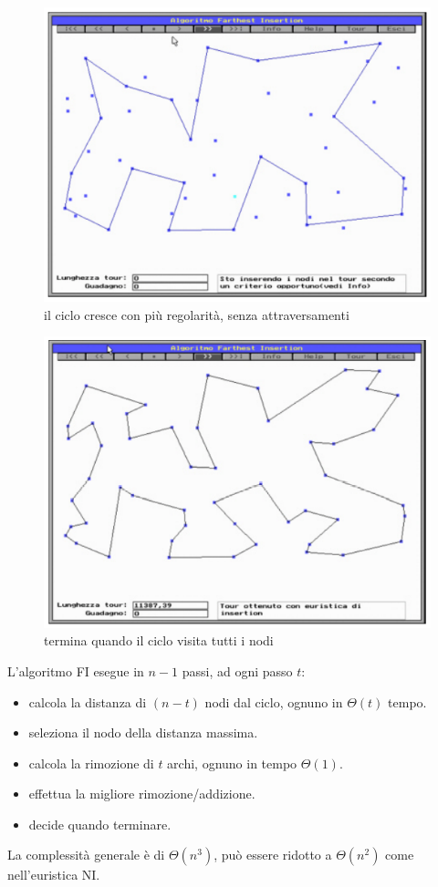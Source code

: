 \documentclass{article}
\begin{document}
\begin{figure}[H]
    \centering
    \includegraphics[scale=0.5]{images/farthest3.png}
    \caption{il ciclo cresce con più regolarità, senza attraversamenti}
\end{figure}

\begin{figure}[H]
    \centering
    \includegraphics[scale=0.5]{images/farthest4.png}
    \caption{termina quando il ciclo visita tutti i nodi}
\end{figure}

L'algoritmo FI esegue in $n-1$ passi, ad ogni passo $t$:
\begin{itemize}
    \item calcola la distanza di $(n-t)$ nodi dal ciclo, ognuno in $\Theta(t)$ tempo.
    \item seleziona il nodo della distanza massima.
    \item calcola la rimozione di $t$ archi, ognuno in tempo $\Theta(1)$.
    \item effettua la migliore rimozione/addizione.
    \item decide quando terminare.
\end{itemize}
La complessità generale è di $\Theta(n^3)$, può essere ridotto a $\Theta(n^2)$ come nell'euristica NI.
\end{document}
